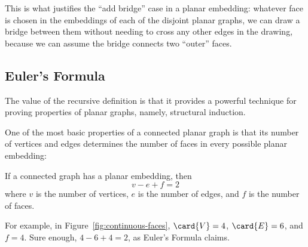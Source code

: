 This is what justifies the ``add bridge'' case in a planar embedding:
whatever face is chosen in the embeddings of each of the disjoint planar
graphs, we can draw a bridge between them without needing to cross any
other edges in the drawing, because we can assume the bridge connects
two ``outer'' faces.

\subsection{Euler's Formula}

The value of the recursive definition is that it provides a powerful
technique for proving properties of planar graphs, namely, structural
induction.

One of the most basic properties of a connected planar graph is that its
number of vertices and edges determines the number of faces in every
possible planar embedding:

\begin{theorem}
If a connected graph has a planar embedding, then
%
\[
v - e + f = 2
\]
%
where $v$ is the number of vertices, $e$ is the number of edges, and
$f$ is the number of faces.
\end{theorem}

For example, in Figure~\ref{fig:continuous-faces}, $\card{V} = 4$,
$\card{E} = 6$, and $f = 4$.  Sure enough, $4 - 6 + 4 = 2$, as Euler's
Formula claims.

